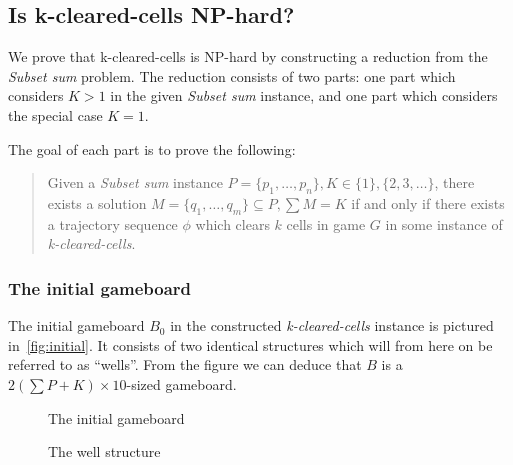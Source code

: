 \subsection{Is k-cleared-cells NP-hard?}

We prove that k-cleared-cells is NP-hard by constructing a reduction from the \textit{Subset sum} problem. The reduction consists of two parts: one part which considers $K > 1$ in the given \textit{Subset sum} instance, and one part which considers the special case $K = 1$.

The goal of each part is to prove the following: 

\begin{quote}
Given a \textit{Subset sum} instance $P = \{p_1, \ldots, p_n\}, K \in \{1\} ,\{2, 3, \ldots \}$, there exists a solution $M = \{q_1, \ldots, q_m \} \subseteq P, \sum M = K$ if and only if there exists a trajectory sequence $\phi$ which clears $k$ cells in game $G$ in some instance of \textit{k-cleared-cells}.
\end{quote}

\subsubsection{The initial gameboard}

The initial gameboard $B_0$ in the constructed \textit{k-cleared-cells} instance is pictured in~\autoref{fig:initial}. It consists of two identical structures which will from here on be referred to as ``wells''. From the figure we can deduce that $B$ is a $2 \left( \sum P + K \right) \times 10$-sized gameboard.

\begin{figure}[H]
    \centering
    \caption{The initial gameboard}
    \label{fig:initial}
\end{figure}

\begin{figure}[H]
    \centering
    \caption{The well structure}
    \label{fig:wells}
\end{figure}
